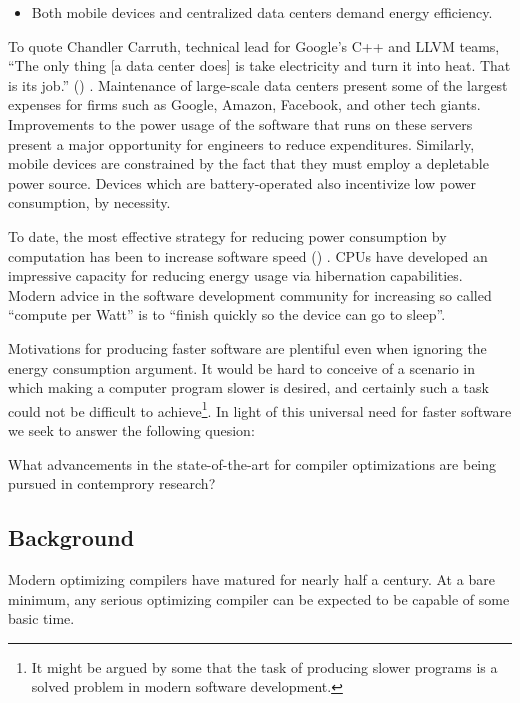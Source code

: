\documentclass[nobib]{tufte-handout}
\newcommand{\placeholdertext}[1]{
	\noindent{\color{red}{#1}}
}
\newcommand{\CiteThis}{
({\color{red}{CITE THIS}})
}
\begin{document}
\begin{itemize}
\item Both mobile devices and centralized data centers demand energy efficiency.
\end{itemize}
To quote Chandler Carruth, technical lead for Google's C++ and LLVM teams, ``The only thing [a data center does] is take electricity and turn it into heat.  That is its job.'' \CiteThis{}.  Maintenance of large-scale data centers present some of the largest expenses for firms such as Google, Amazon, Facebook, and other tech giants.  Improvements to the power usage of the software that runs on these servers present a major opportunity for engineers to reduce expenditures.  Similarly, mobile devices are constrained by the fact that they must employ a depletable power source.  Devices which are battery-operated also incentivize low power consumption, by necessity.

To date, the most effective strategy for reducing power consumption by computation has been to increase software speed \CiteThis{}.  CPUs have developed an impressive capacity for reducing energy usage via hibernation capabilities.  Modern advice in the software development community for increasing so called ``compute per Watt'' is to ``finish quickly so the device can go to sleep''.

Motivations for producing faster software are plentiful even when ignoring the energy consumption argument.  It would be hard to conceive of a scenario in which making a computer program slower is desired, and certainly such a task could not be difficult to achieve\footnote{It might be argued by some that the task of producing slower programs is a solved problem in modern software development.}.  In light of this universal need for faster software we seek to answer the following quesion:

\begin{displayquote}
What advancements in the state-of-the-art for compiler optimizations are being pursued in contemprory research?
\end{displayquote}




\subsection{Background}
\placeholdertext{Discuss fact that CPUs are super complex and compilers know it.}
Modern optimizing compilers have matured for nearly half a century.  At a bare minimum, any serious optimizing compiler can be expected to be capable of some basic time.
\end{document}
